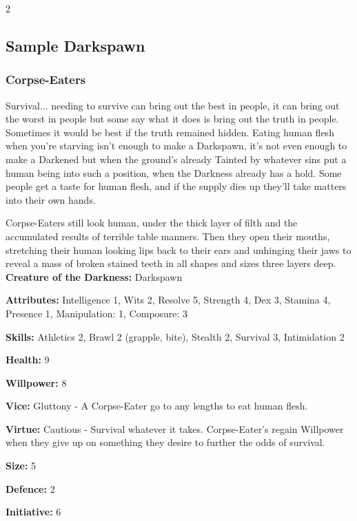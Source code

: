 \begin{multicols}{2}
\subsection*{Sample Darkspawn}

\label{subsec:SampleDarkspawn}
\subsubsection*{Corpse-Eaters}

Survival... needing to survive can bring out the best in people, it can bring out the worst in people but some say what it does is bring out the truth in people. Sometimes it would be best if the truth remained hidden. Eating human flesh when you're starving isn't enough to make a Darkspawn, it's not even enough to make a Darkened but when the ground's already Tainted by whatever sins put a human being into such a position, when the Darkness already has a hold. Some people get a taste for human flesh, and if the supply dies up they'll take matters into their own hands.

Corpse-Eaters still look human, under the thick layer of filth and the accumulated results of terrible table manners. Then they open their mouths, stretching their human looking lips back to their ears and unhinging their jaws to reveal a mass of broken stained teeth in all shapes and sizes three layers deep.\\

\noindent \textbf{Creature of the Darkness:} Darkspawn

\noindent \textbf{Attributes:} Intelligence 1, Wits 2, Resolve 5, Strength 4, Dex 3, Stamina 4, Presence 1, Manipulation: 1, Composure: 3

\noindent \textbf{Skills:} Athletics 2, Brawl 2 (grapple, bite), Stealth 2, Survival 3, Intimidation 2

\noindent \textbf{Health:} 9

\noindent \textbf{Willpower:} 8

\noindent \textbf{Vice:} Gluttony - A Corpse-Eater go to any lengths to eat human flesh.

\noindent \textbf{Virtue:} Cautious - Survival whatever it takes. Corpse-Eater's regain Willpower when they give up on something they desire to further the odds of survival.

\noindent \textbf{Size:} 5

\noindent \textbf{Defence:} 2

\noindent \textbf{Initiative:} 6


\end{multicols}
